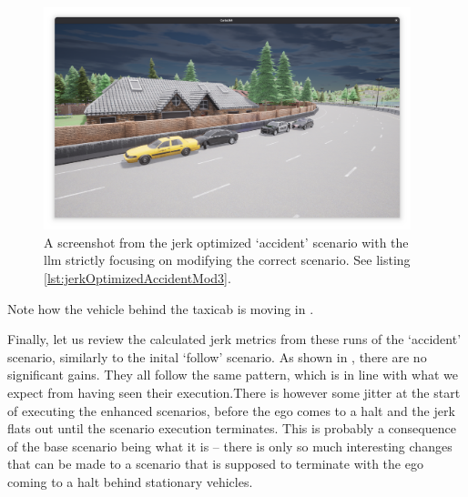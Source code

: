 \begin{figure}[htb]
    \centering
    \includegraphics[width=0.95\textwidth]{experiment-material/accident-pics/mod-3/freecam.png}
    \caption{A screenshot from the jerk optimized `accident' scenario with the \acrshort{llm}
        strictly focusing on modifying the correct scenario. See listing
        \ref{lst:jerkOptimizedAccidentMod3}.}\label{fig:accidentMod3FinalFreecam}
\end{figure}

Note how the vehicle behind the taxicab is moving in .

Finally, let us review the calculated jerk metrics from these runs of the `accident' scenario,
similarly to the inital `follow' scenario. As shown in , there are
no significant gains. They all follow the same pattern, which is in line with what we expect from
having seen their execution.There is however some jitter at the start of executing the enhanced
scenarios, before the ego comes to a halt and the jerk flats out until the scenario execution
terminates. This is probably a consequence of the base scenario being what it is -- there is only so
much interesting changes that can be made to a scenario that is supposed to terminate with the ego
coming to a halt behind stationary vehicles.

